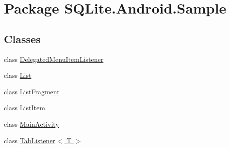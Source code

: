 \hypertarget{namespace_s_q_lite_1_1_android_1_1_sample}{\section{Package S\+Q\+Lite.\+Android.\+Sample}
\label{namespace_s_q_lite_1_1_android_1_1_sample}
}
\subsection*{Classes}
\begin{DoxyCompactItemize}
\item 
class \hyperlink{class_s_q_lite_1_1_android_1_1_sample_1_1_delegated_menu_item_listener}{Delegated\+Menu\+Item\+Listener}
\item 
class \hyperlink{class_s_q_lite_1_1_android_1_1_sample_1_1_list}{List}
\item 
class \hyperlink{class_s_q_lite_1_1_android_1_1_sample_1_1_list_fragment}{List\+Fragment}
\item 
class \hyperlink{class_s_q_lite_1_1_android_1_1_sample_1_1_list_item}{List\+Item}
\item 
class \hyperlink{class_s_q_lite_1_1_android_1_1_sample_1_1_main_activity}{Main\+Activity}
\item 
class \hyperlink{class_s_q_lite_1_1_android_1_1_sample_1_1_tab_listener_3_01_t_01_4}{Tab\+Listener$<$ T $>$}
\end{DoxyCompactItemize}
